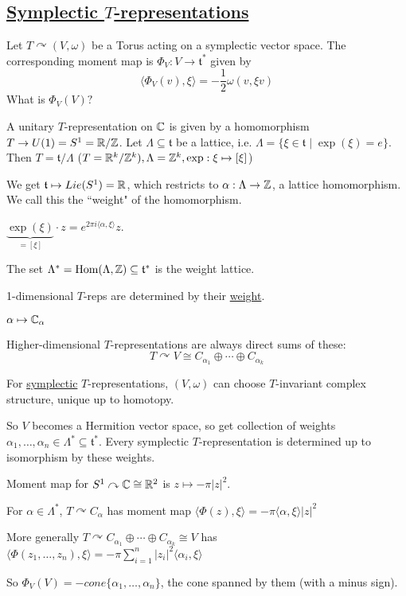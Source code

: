 \documentclass[x11names,reqno,14pt]{extarticle}
\newcommand{\mk}[1]{\mathfrak{#1}}
\renewcommand{\t}{\mk{t}}
\begin{document}
\subsection*{\underline{Symplectic $T$-representations}}

Let $T \curvearrowright(V,\omega)$ be a Torus acting on a symplectic vector space. The corresponding moment map is $\Phi_V:V\to\t^*$ given by 
\[
\langle\Phi_V(v),\xi\rangle = -\frac12\omega(v,\xi v)
\]
What is $\Phi_V(V)?$

A unitary $T$-representation on $\mathbb{C}$ is given by a homomorphism $T \to U(1) = S^1 = \mathbb{R}/\mathbb{Z}$. Let $\Lambda \subseteq\t$ be a lattice, i.e. $\Lambda = \{\xi\in \t \mid \exp(\xi) = e\}$. Then $T = \t/\Lambda$ ($T = \mathbb{R}^k/\mathbb{Z}^k), \Lambda = \mathbb{Z}^k, \exp:\xi\mapsto[\xi]$)

We get $\t \mapsto Lie(S^1) = \R$, which restricts to $\alpha:\Lambda\to\mathbb{Z}$, a lattice homomorphism. We call this the ``weight" of the homomorphism. 

$\underbrace{\exp(\xi)}_{=[\xi]}\cdot z = e^{2\pi i \langle \alpha,\xi\rangle}z$.

The set $\Lambda^* = \Hom(\Lambda,\Z)\subseteq\t^*$ is the weight lattice. 

1-dimensional $T$-reps are determined by their \underline{weight}. 

$\alpha \mapsto \mathbb{C}_\alpha$

Higher-dimensional $T$-representations are always direct sums of these: 
\[
T\curvearrowright V \cong C_{\alpha_1}\oplus \cdots \oplus C_{\alpha_k}
\]

For \underline{symplectic} $T$-representations, $(V,\omega)$ can choose $T$-invariant complex structure, unique up to homotopy. 

So $V$ becomes a Hermition vector space, so get collection of weights $\alpha_1,\dots,\alpha_n\in \Lambda^*\subseteq\t^*$. Every symplectic $T$-representation is determined up to isomorphism by these weights. 

Moment map for $S^1 \curvearrowright \mathbb{C} \cong \mathbb{R}^2$ is $z \mapsto -\pi|z|^2$. 

For $\alpha \in \Lambda^*$, $T \curvearrowright C_\alpha$ has moment map $\langle\Phi(z),\xi\rangle = -\pi\langle\alpha,\xi\rangle|z|^2$

More generally $T \curvearrowright C_{\alpha_1}\oplus\cdots\oplus C_{\alpha_k} \cong V$ has $\langle\Phi(z_1,\dots,z_n), \xi \rangle = -\pi\sum_{i=1}^n|z_i|^2\langle\alpha_i,\xi\rangle$

So $\Phi_V(V) = -cone\{\alpha_1,\dots,\alpha_n\}$, the cone spanned by them (with a minus sign). 
\end{document}
